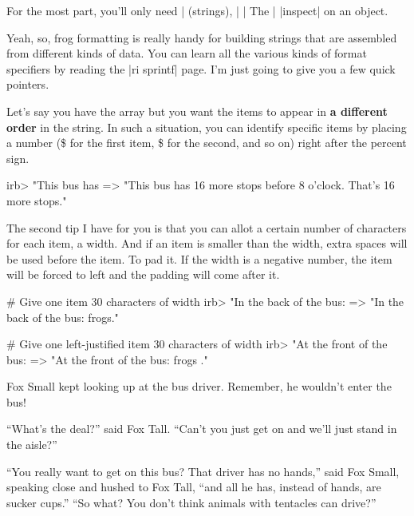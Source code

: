 \documentclass[12pt,twoside]{report}
\newcommand*{\plaininline}{\fontfamily{fvm}\small\selectfont}
\begin{document}
For the most part, you'll only need \rubyinline|%
(strings), \rubyinline|%
\rubyinline|%
The \rubyinline|%
\rubyinline|inspect| on an object.

Yeah, so, frog formatting is really handy for building strings that
are assembled from different kinds of data.  You can learn all the
various kinds of format specifiers by reading the
\rubyinline|ri sprintf| page.  I'm just going to give
you a few quick pointers.

Let's say you have the array but you want the items to appear in {\bf
  a different order} in the string.  In such a situation, you can
identify specific items by placing a number
({\plaininline 1\$} for the first item,
{\plaininline 2\$} for the second, and so on) right after
the percent sign.


\begin{consolecode}

 irb> "This bus has %
   => "This bus has 16 more stops before 8 o'clock.  That's 16 more stops."

\end{consolecode}


The second tip I have for you is that you can allot a certain number
of characters for each item, a width.  And if an item is smaller than
the width, extra spaces will be used before the item.  To pad it. If
the width is a negative number, the item will be forced to left and
the padding will come after it.


\begin{consolecode}

 # Give one item 30 characters of width
 irb> "In the back of the bus: %
   => "In the back of the bus:                          frogs."

 # Give one left-justified item 30 characters of width
 irb> "At the front of the bus: %
   => "At the front of the bus: frogs                         ."

\end{consolecode}


Fox Small kept looking up at the bus driver.  Remember, he wouldn't
enter the bus!

``What's the deal?'' said Fox Tall.  ``Can't you just get on and we'll
just stand in the aisle?''

``You really want to get on this bus?  That driver has no hands,''
said Fox Small, speaking close and hushed to Fox Tall, ``and all he
has, instead of hands, are sucker cups.''  ``So what?  You don't think
animals with tentacles can drive?''
\end{document}
